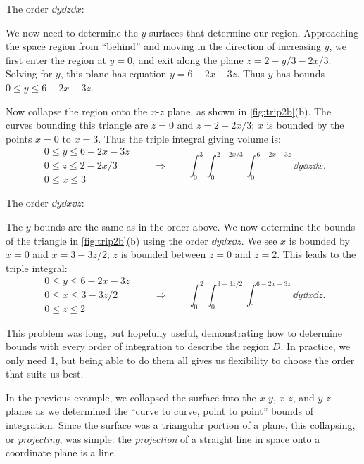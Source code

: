 \begin{example}
\noindent The order $\dd y\dd z\dd x$:\bigskip

We now need to determine the $y$-surfaces that determine our region. Approaching the space region from ``behind'' and moving in the direction of increasing $y$, we first enter the region at $y=0$, and exit along the plane $z= 2-y/3-2x/3$. Solving for $y$, this plane has equation $y = 6-2x-3z$. Thus $y$ has bounds $0\leq y\leq 6-2x-3z$. 

Now collapse the region onto the $x$-$z$ plane, as shown in \autoref{fig:trip2b}(b). The curves bounding this triangle are $z=0$ and $z=2-2x/3$; $x$ is bounded by the points $x=0$ to $x=3$. Thus the triple integral giving volume is: 
\[
 \begin{gathered}
  0\leq y\leq 6-2x-3z\\
  0\leq z\leq 2-2x/3\\
  0\leq x\leq 3
 \end{gathered}
 \qquad\Rightarrow\qquad
 \int_0^3\int_0^{2-2x/3}\int_0^{6-2x-3z}\dd y\dd z\dd x.
\]

\noindent The order $\dd y\dd x\dd z$:\bigskip

The $y$-bounds are the same as in the order above. We now determine the bounds of the triangle in \autoref{fig:trip2b}(b) using the order $\dd y\dd x\dd z$. We see $x$ is bounded by $x=0$ and $x=3-3z/2$; $z$ is bounded between $z=0$ and $z=2$. This leads to the triple integral:
\[
 \begin{gathered}
  0\leq y\leq 6-2x-3z\\
  0\leq x\leq 3-3z/2\\
  0\leq z\leq 2
 \end{gathered}
 \qquad\Rightarrow\qquad
 \int_0^2\int_0^{3-3z/2}\int_0^{6-2x-3z}\dd y\dd x\dd z.
\]

This problem was long, but hopefully useful, demonstrating how to determine bounds with every order of integration to describe the region $D$. In practice, we only need 1, but being able to do them all gives us flexibility to choose the order that suits us best.
\end{example}

In the previous example, we collapsed the surface into the $x$-$y$, $x$-$z$, and $y$-$z$ planes as we determined the ``curve to curve, point to point'' bounds of integration. Since the surface was a triangular portion of a plane, this collapsing, or \emph{projecting}, was simple: the \emph{projection} of a straight line in space onto a coordinate plane is a line.

